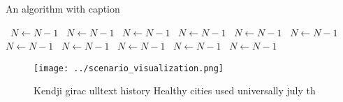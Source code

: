 \documentclass[a4paper]{article}
\begin{document}
\begin{algorithm}
\caption{An algorithm with caption}
\begin{algorithmic}
\    \State $N \gets N - 1$
\    \State $N \gets N - 1$
\    \State $N \gets N - 1$
\    \State $N \gets N - 1$
\    \State $N \gets N - 1$
\    \State $N \gets N - 1$
\    \State $N \gets N - 1$
\    \State $N \gets N - 1$
\    \State $N \gets N - 1$
\    \State $N \gets N - 1$
\    \State $N \gets N - 1$
\EndWhile
\end{algorithmic}
\end{algorithm}

\begin{figure}
\centering
\texttt{[image: ../scenario\_visualization.png]}
\caption{Kendji girac ulltext history Healthy cities used universally  july th
}
\end{figure}
 
\end{document}

